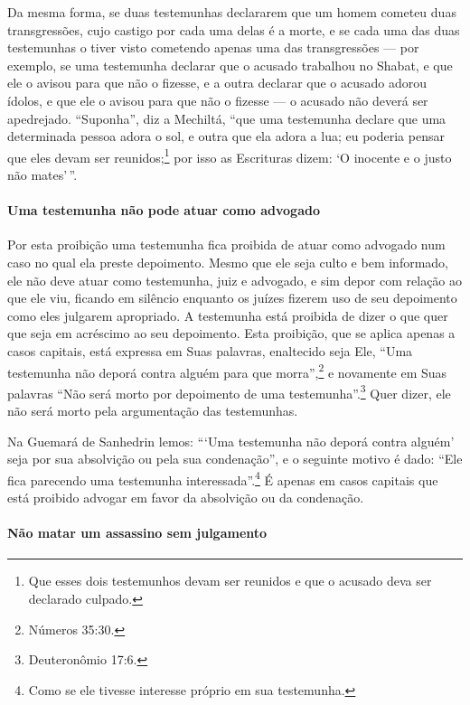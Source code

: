 \begin{multicols}{2}
Da mesma forma, se duas testemunhas declararem que um homem cometeu duas
transgressões, cujo castigo por cada uma delas é a morte, e se cada uma
das duas testemunhas o tiver visto cometendo apenas uma das
transgressões --- por exemplo, se uma testemunha declarar que o acusado
trabalhou no Shabat, e que ele o avisou para que não o fizesse, e a
outra declarar que o acusado adorou ídolos, e que ele o avisou para que
não o fizesse --- o acusado não deverá ser apedrejado. ``Suponha'', diz
a Mechiltá\starr, ``que uma testemunha declare que uma determinada pessoa
adora o sol, e outra que ela adora a lua;
eu poderia pensar que eles devam ser reunidos;\footnote{Que esses dois testemunhos devam ser reunidos e que o acusado deva ser declarado culpado.} por
isso as Escrituras dizem: `O inocente e o justo não mates'\,''.

\paragraph{Uma testemunha não pode atuar como advogado}

Por esta proibição uma testemunha fica proibida de atuar como advogado
num caso no qual ela preste depoimento. Mesmo que ele seja culto e bem
informado, ele não deve atuar como testemunha, juiz e advogado, e sim
depor com relação ao que ele viu, ficando em silêncio enquanto os juízes
fizerem uso de seu depoimento como eles julgarem apropriado. A
testemunha está proibida de dizer o que quer que seja em acréscimo ao
seu depoimento. Esta proibição, que se aplica apenas a casos capitais,
está expressa em Suas palavras, enaltecido seja Ele, ``Uma testemunha
não deporá contra alguém para que morra'',\footnote{Números 35:30.} e novamente
em Suas palavras ``Não será morto por depoimento de uma testemunha''.\footnote{Deuteronômio 17:6.} Quer dizer, ele não será morto pela argumentação
das testemunhas.

Na Guemará\starr{} de Sanhedrin\starr{} lemos: ```Uma testemunha não deporá contra
alguém' seja por sua absolvição ou pela sua condenação'', e o seguinte
motivo é dado: ``Ele fica parecendo uma testemunha
interessada''.\footnote{Como se ele tivesse interesse próprio em sua testemunha.}
É apenas em casos capitais que está proibido advogar em favor da
absolvição ou da condenação.

\paragraph{Não matar um assassino sem julgamento}


\end{multicols}
